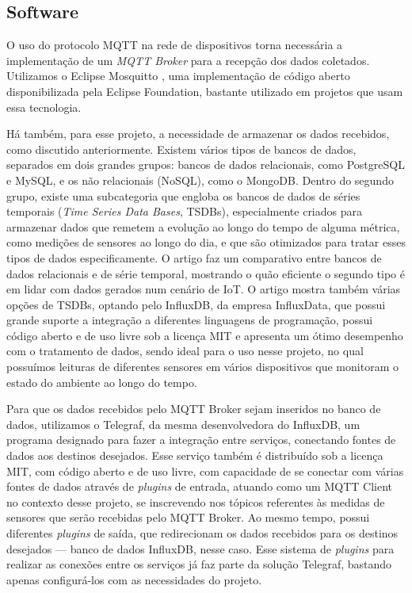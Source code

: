 \documentclass[../monografia.tex]{subfiles}
\begin{document}

\subsection{Software}

O uso do protocolo MQTT na rede de dispositivos torna necessária a implementação de um \textit{MQTT Broker} para a recepção dos dados coletados. Utilizamos o Eclipse Mosquitto \cite{mosquitto}, uma implementação de código aberto disponibilizada pela Eclipse Foundation, bastante utilizado em projetos que usam essa tecnologia.

Há também, para esse projeto, a necessidade de armazenar os dados recebidos, como discutido anteriormente. Existem vários tipos de bancos de dados, separados em dois grandes grupos: bancos de dados relacionais, como PostgreSQL e MySQL, e os não relacionais (NoSQL), como o MongoDB. Dentro do segundo grupo, existe uma subcategoria que engloba os bancos de dados de séries temporais (\textit{Time Series Data Bases}, TSDBs), especialmente criados para armazenar dados que remetem a evolução ao longo do tempo de alguma métrica, como medições de sensores ao longo do dia, e que são otimizados para tratar esses tipos de dados especificamente. O artigo \cite{timeseries-databases} faz um comparativo entre bancos de dados relacionais e de série temporal, mostrando o quão eficiente o segundo tipo é em lidar com dados gerados num cenário de IoT. O artigo mostra também várias opções de TSDBs, optando pelo InfluxDB, da empresa InfluxData, que possui grande suporte a integração a diferentes linguagens de programação, possui código aberto e de uso livre sob a licença MIT e apresenta um ótimo desempenho com o tratamento de dados, sendo ideal para o uso nesse projeto, no qual possuímos leituras de diferentes sensores em vários dispositivos que monitoram o estado do ambiente ao longo do tempo.

Para que os dados recebidos pelo MQTT Broker sejam inseridos no banco de dados, utilizamos o Telegraf, da mesma desenvolvedora do InfluxDB, um programa designado para fazer a integração entre serviços, conectando fontes de dados aos destinos desejados. Esse serviço também é distribuído sob a licença MIT, com código aberto e de uso livre, com capacidade de se conectar com várias fontes de dados através de \textit{plugins} de entrada, atuando como um MQTT Client no contexto desse projeto, se inscrevendo nos tópicos referentes às medidas de sensores que serão recebidas pelo MQTT Broker. Ao mesmo tempo, possui diferentes \textit{plugins} de saída, que redirecionam os dados recebidos para os destinos desejados --- banco de dados InfluxDB, nesse caso. Esse sistema de \textit{plugins} para realizar as conexões entre os serviços já faz parte da solução Telegraf, bastando apenas configurá-los com as necessidades do projeto.
\end{document}
